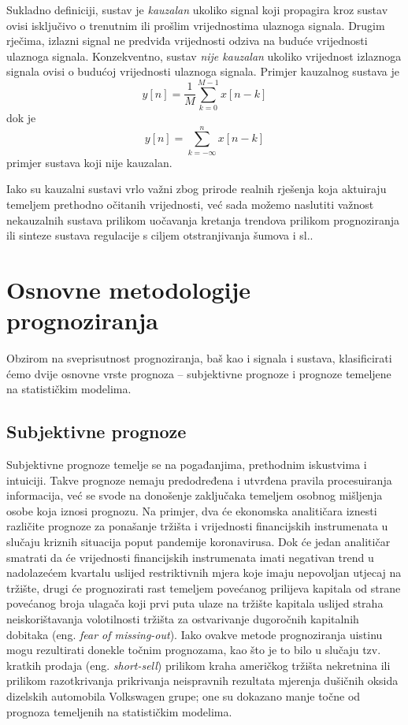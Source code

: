 \documentclass[a4paper,12pt,oneside]{memoir}
\newcommand{\kauzalni}{y[n]=\frac{1}{M}\displaystyle\sum_{k=0}^{M-1 }x[n-k]}
\newcommand{\nekauzalni}{y[n]=\displaystyle\sum_{k=-\infty}^{n}x[n-k]}
\begin{document}
                Sukladno definiciji, sustav je \textit{kauzalan} ukoliko signal koji propagira kroz sustav ovisi isključivo o trenutnim ili prošlim vrijednostima ulaznoga signala. Drugim rječima, izlazni signal ne predviđa vrijednosti odziva na buduće vrijednosti ulaznoga signala. Konzekventno, sustav \textit{nije kauzalan} ukoliko vrijednost izlaznoga signala ovisi o budućoj vrijednosti ulaznoga signala. Primjer kauzalnog sustava je
                \begin{equation}
                    \kauzalni
                \end{equation}
                dok je
                \begin{equation}
                    \nekauzalni
                \end{equation}
                primjer sustava koji nije kauzalan.

                Iako su kauzalni sustavi vrlo važni zbog prirode realnih rješenja koja aktuiraju temeljem prethodno očitanih vrijednosti, već sada možemo naslutiti važnost nekauzalnih sustava prilikom uočavanja kretanja trendova prilikom prognoziranja ili sinteze sustava regulacije s ciljem otstranjivanja šumova i sl..

    \chapter{Osnovne metodologije prognoziranja}
        Obzirom na sveprisutnost prognoziranja, baš kao i signala i sustava, klasificirati ćemo dvije osnovne vrste prognoza -- subjektivne prognoze i prognoze temeljene na statističkim modelima.\cite{Holden}

        \section{Subjektivne prognoze}

            Subjektivne prognoze temelje se na pogađanjima, prethodnim iskustvima i intuiciji. Takve prognoze nemaju predodređena i utvrđena pravila procesuiranja informacija, već se svode na donošenje zaključaka temeljem osobnog mišljenja osobe koja iznosi prognozu. Na primjer, dva će ekonomska analitičara iznesti različite prognoze za ponašanje tržišta i vrijednosti financijskih instrumenata u slučaju kriznih situacija poput pandemije koronavirusa. Dok će jedan analitičar smatrati da će vrijednosti financijskih instrumenata imati negativan trend u nadolazećem kvartalu uslijed restriktivnih mjera koje imaju nepovoljan utjecaj na tržište, drugi će prognozirati rast temeljem povećanog prilijeva kapitala od strane povećanog broja ulagača koji prvi puta ulaze na tržište kapitala uslijed straha neiskorištavanja volotilnosti tržišta za ostvarivanje dugoročnih kapitalnih dobitaka (eng. \textit{fear of missing-out}). Iako ovakve metode prognoziranja uistinu mogu rezultirati donekle točnim prognozama, kao što je to bilo u slučaju tzv. kratkih prodaja (eng. \textit{short-sell}) prilikom kraha američkog tržišta nekretnina ili prilikom razotkrivanja prikrivanja neispravnih rezultata mjerenja dušičnih oksida dizelskih automobila Volkswagen grupe; one su dokazano manje točne od prognoza temeljenih na statističkim modelima.
\end{document}
